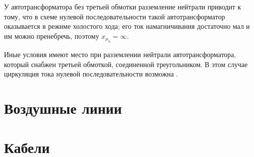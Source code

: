 У автотрансформатора без третьей обмотки разземление нейтрали приводит к тому, что в схеме нулевой последовательности такой автотрансформатор оказывается в режиме холостого хода; его ток намагничивания достаточно мал и им можно пренебречь, поэтому $ x_{\mu_0} = \infty $.

Иные условия имеют место при разземлении нейтрали автотрансформатора, который снабжен третьей обмоткой, соединенной треугольником. В этом случае циркуляция тока нулевой последовательности возможна \cite{04Ulianov64}.





















\section{Воздушные линии}
\label{sec:12-7}


\section{Кабели}
\label{sec:12-8}